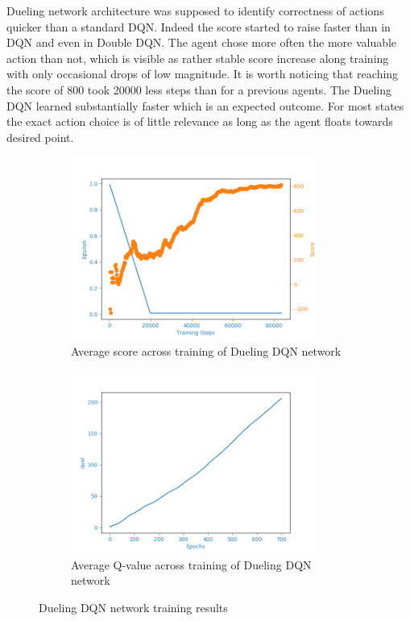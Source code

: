 Dueling network architecture was supposed to identify correctness of actions quicker than a standard DQN. Indeed the score started to raise faster
than in DQN and even in Double DQN. The agent chose more often the more valuable action than not, which is visible as rather stable score increase
along training with only occasional drops of low magnitude. It is worth noticing that reaching the score of 800 took 20000 less steps than for a
previous agents. The Dueling DQN learned substantially faster which is an expected outcome. For most states the exact action choice is of little
relevance as long as the agent floats towards desired point.

\begin{figure}[htb]
\begin{subfigure}{.48\textwidth}
    \centering
    \includegraphics[width=8cm]{img/DuelingDQNAgent_WamvNavTwoSetsBuoys-v0_normal_1128_1318.png}
    \caption{Average score across training of Dueling DQN network}
    \label{fig:avg-score-dueling-dqn}
\end{subfigure}
\begin{subfigure}{.48\textwidth}
    \centering
    \includegraphics[width=8cm]{img/DuelingDQNAgent_WamvNavTwoSetsBuoys-v0_normal_1128_1318_qval.png}
    \caption{Average Q-value across training of Dueling DQN network}
\end{subfigure}
\caption{Dueling DQN network training results}
\label{fig:results-dueling-dqn}
\end{figure}

